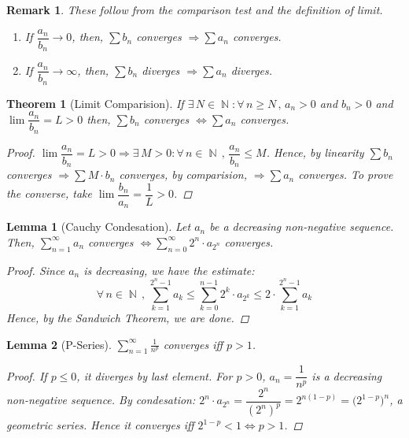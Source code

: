\documentclass[12pt]{article}
\let\RA\Rightarrow
\let\LR\Leftrightarrow
\newcommand{\Forall}[1]{\forall\,{#1}\,,\,}
\newcommand{\Exist}[1]{\exists\,{#1}:}
\DeclareMathOperator{\N}{\mathbb{N}}
\newtheorem{theorem}{Theorem}[subsection]
\newtheorem{lemma}{Lemma}[subsection]
\newtheorem{remark}{Remark}[subsection]
\begin{document}
\begin{remark}
  These follow from the comparison test and the definition of limit.
  \begin{enumerate}
    \item If $\dfrac{a_n}{b_n}\to 0$, then, $\sum b_n$ converges $\RA\sum a_n$ converges.
    \item If $\dfrac{a_n}{b_n}\to \infty$, then, $\sum b_n$ diverges $\RA\sum a_n$ diverges.
  \end{enumerate}
\end{remark}

\begin{theorem}[Limit Comparision]
  If $\Exist{N\in\N}\Forall{n\geq N} a_n>0$ and $b_n>0$ and $\lim\dfrac{a_n}{b_n}=L>0$ then, $\sum b_n$ converges $\LR\sum a_n$ converges.
  \begin{proof}
    $\lim\dfrac{a_n}{b_n}=L>0\RA \Exist{M>0}\Forall{n\in\N}\dfrac{a_n}{b_n}\leq M$. Hence, by linearity $\sum b_n$ converges $\RA \sum M\cdot b_n$ converges, by comparision, $\RA \sum a_n$ converges. To prove the converse, take $\lim\dfrac{b_n}{a_n}=\dfrac{1}{L}>0$.
  \end{proof}
\end{theorem}

\begin{lemma}[Cauchy Condesation]
  Let $a_n$ be a decreasing non-negative sequence. Then, $\sum_{n=1}^\infty a_n$ converges $\LR \sum_{n=0}^\infty 2^n\cdot a_{2^n}$ converges.
  \begin{proof}
    Since $a_n$ is decreasing, we have the estimate: $$\Forall{n\in\N}\sum_{k=1}^{2^n-1}a_k\leq \sum_{k=0}^{n-1} 2^k\cdot a_{2^k}\leq 2\cdot\sum_{k=1}^{2^n-1}a_k$$
    Hence, by the Sandwich Theorem, we are done.
  \end{proof}
\end{lemma}

\begin{lemma}[P-Series]
  $\displaystyle\sum_{n=1}^\infty\frac{1}{n^p}$ converges iff $p>1$.
  \begin{proof}
    If $p\leq 0$, it diverges by last element. For $p>0$, $a_n=\dfrac{1}{n^p}$ is a decreasing non-negative sequence. By condesation: $2^n\cdot a_{2^n}=\dfrac{2^n}{(2^n)^p}=2^{n(1-p)}=\Big(2^{1-p}\Big)^n$, a geometric series. Hence it converges iff $2^{1-p}<1\LR p>1$.
  \end{proof}
\end{lemma}
\end{document}

